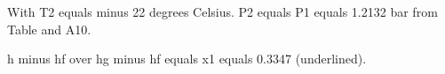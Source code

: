 With T2 equals minus 22 degrees Celsius.  
P2 equals P1 equals 1.2132 bar from Table and A10.  

h minus hf over hg minus hf equals x1 equals 0.3347 (underlined).